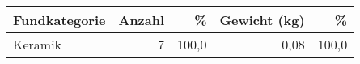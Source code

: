 \begin{tabular}{@{}lrrrr@{}}
\toprule
Fundkategorie &  Anzahl &     \% &  Gewicht (kg) &     \% \\
\midrule
      Keramik &       7 &  100,0 &          0,08 &  100,0 \\
\bottomrule
\end{tabular}
